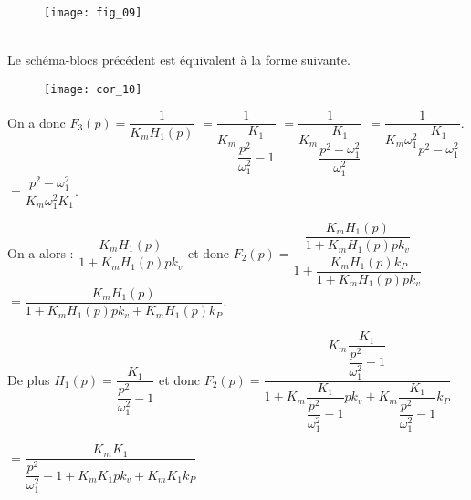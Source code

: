 \fi


\ifprof
\else
\begin{figure}[H]
\centering
\texttt{[image: fig\_09]}
\end{figure}
\fi

\ifprof
\begin{corrige}~\\
Le schéma-blocs précédent est équivalent à la forme suivante. 
\begin{figure}[H]
\centering
\texttt{[image: cor\_10]}
\end{figure}

On a donc $F_3(p)=\dfrac{1}{K_mH_1(p)}$ $=\dfrac{1}{K_m\dfrac{K_1}{\dfrac{p^2}{\omega_1^2}-1}}$
 $=\dfrac{1}{K_m\dfrac{K_1}{\dfrac{p^2-\omega_1^2}{\omega_1^2}}}$
  $=\dfrac{1}{K_m\omega_1^2\dfrac{K_1}{p^2-\omega_1^2}}$.
    $=\dfrac{p^2-\omega_1^2}{K_m\omega_1^2K_1}$.

On a alors : $\dfrac{K_m H_1(p)}{1+K_m H_1(p)pk_v}$ et donc 
$F_2(p)=\dfrac{\dfrac{K_m H_1(p)}{1+K_m H_1(p)pk_v}}{1+\dfrac{K_m H_1(p)k_P}{1+K_m H_1(p)pk_v}}$
$= \dfrac{K_m H_1(p)}{1+K_m H_1(p)pk_v+K_m H_1(p)k_P}$.


De plus $H_1(p)=\dfrac{K_1}{\dfrac{p^2}{\omega_1^2}-1}$ et donc 
$F_2(p)= \dfrac{K_m \dfrac{K_1}{\dfrac{p^2}{\omega_1^2}-1}}{1+K_m \dfrac{K_1}{\dfrac{p^2}{\omega_1^2}-1}pk_v+K_m \dfrac{K_1}{\dfrac{p^2}{\omega_1^2}-1}k_P}$

$= \dfrac{K_m K_1}{\dfrac{p^2}{\omega_1^2}-1+K_m K_1pk_v+K_m K_1k_P}$

\end{corrige}
\else
\fi

